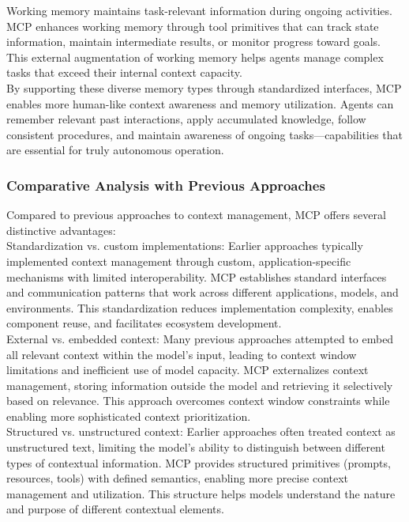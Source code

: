 Working memory maintains task-relevant information during ongoing activities. MCP enhances working memory through tool primitives that can track state information, maintain intermediate results, or monitor progress toward goals. This external augmentation of working memory helps agents manage complex tasks that exceed their internal context capacity.\\ \newline
By supporting these diverse memory types through standardized interfaces, MCP enables more human-like context awareness and memory utilization. Agents can remember relevant past interactions, apply accumulated knowledge, follow consistent procedures, and maintain awareness of ongoing tasks—capabilities that are essential for truly autonomous operation.\\
\subsubsection{Comparative Analysis with Previous Approaches}
Compared to previous approaches to context management, MCP offers several distinctive advantages:\\ \newline
Standardization vs. custom implementations: Earlier approaches typically implemented context management through custom, application-specific mechanisms with limited interoperability. MCP establishes standard interfaces and communication patterns that work across different applications, models, and environments. This standardization reduces implementation complexity, enables component reuse, and facilitates ecosystem development.\\ \newline
External vs. embedded context: Many previous approaches attempted to embed all relevant context within the model's input, leading to context window limitations and inefficient use of model capacity. MCP externalizes context management, storing information outside the model and retrieving it selectively based on relevance. This approach overcomes context window constraints while enabling more sophisticated context prioritization.\\ \newline
Structured vs. unstructured context: Earlier approaches often treated context as unstructured text, limiting the model's ability to distinguish between different types of contextual information. MCP provides structured primitives (prompts, resources, tools) with defined semantics, enabling more precise context management and utilization. This structure helps models understand the nature and purpose of different contextual elements.\\ \newline

